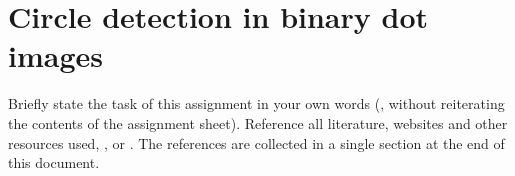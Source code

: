 \chapter{Circle detection in binary dot images}

Briefly state the task of this assignment in your own words (\ie, without reiterating the
contents of the assignment sheet). Reference all literature, websites and other resources used,
\eg, \cite{Higham1998,Guttman2001} or \cite{Mermin1989}. 
The references are collected in a single section at the end of this document.